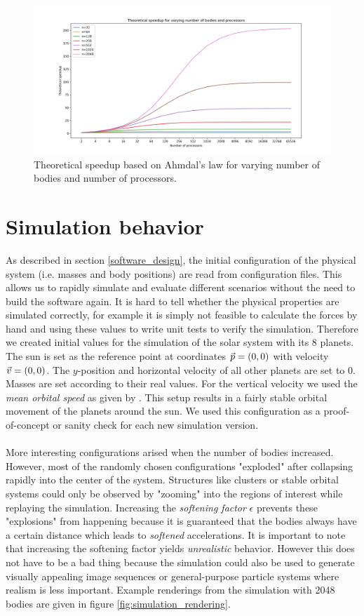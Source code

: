 \documentclass[a4paper,11pt]{scrartcl} %
\newcommand*{\vv}[1]{\vec{\mkern0mu#1}}
\begin{document}
\begin{figure}[h!]
  \centering
  \includegraphics[width=\textwidth]{img/speedup.png}
  \caption{Theoretical speedup based on Ahmdal's law for varying number of bodies and number of processors.}
  \label{fig:speedup}
\end{figure}

\section{Simulation behavior}
As described in section \ref{software_design}, the initial configuration of the physical system (i.e. masses and body positions) are read from configuration files. This allows us to rapidly simulate and evaluate different scenarios without the need to build the software again. It is hard to tell whether the physical properties are simulated correctly, for example it is simply not feasible to calculate the forces by hand and using these values to write unit tests to verify the simulation. Therefore we created initial values for the simulation of the solar system with its 8 planets. The sun is set as the reference point at coordinates $\vv{p}=(0,0)$ with velocity $\vv{v}=(0,0)$. The $y$-position and horizontal velocity of all other planets are set to 0. Masses are set according to their real values. For the vertical velocity we used the \textit{mean orbital speed} as given by \cite{wikiplanets}. This setup results in a fairly stable orbital movement of the planets around the sun. We used this configuration as a proof-of-concept or sanity check for each new simulation version.\\\\
More interesting configurations arised when the number of bodies increased. However, most of the randomly chosen configurations "exploded" after collapsing rapidly into the center of the system. Structures like clusters or stable orbital systems could only be observed by "zooming" into the regions of interest while replaying the simulation. Increasing the \textit{softening factor} $\epsilon$ prevents these "explosions" from happening because it is guaranteed that the bodies always have a certain distance which leads to \textit{softened} accelerations. It is important to note that increasing the softening factor yields \textit{unrealistic} behavior. However this does not have to be a bad thing because the simulation could also be used to generate visually appealing image sequences or general-purpose particle systems where realism is less important. Example renderings from the simulation with 2048 bodies are given in figure \ref{fig:simulation_rendering}.
\end{document}
